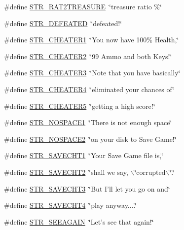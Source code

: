 \begin{DoxyCompactItemize}
\item 
\#define \hyperlink{FOREIGN_8H_aa2919e6a6af42cb4961631cf10e5a1b1}{STR\_\-RAT2TREASURE}~\char`\"{}treasure ratio    \%\char`\"{}
\item 
\#define \hyperlink{FOREIGN_8H_a0047673716c48cf2c05d5eb4bb2c71db}{STR\_\-DEFEATED}~\char`\"{}defeated!\char`\"{}
\item 
\#define \hyperlink{FOREIGN_8H_ab1be9c9331209b53ff85b5f8ee223cd4}{STR\_\-CHEATER1}~\char`\"{}You now have 100\% Health,\char`\"{}
\item 
\#define \hyperlink{FOREIGN_8H_a4c008f449f124be04de3ab1a9c850009}{STR\_\-CHEATER2}~\char`\"{}99 Ammo and both Keys!\char`\"{}
\item 
\#define \hyperlink{FOREIGN_8H_a9b0cd198a6495bd0e515f7766192b57f}{STR\_\-CHEATER3}~\char`\"{}Note that you have basically\char`\"{}
\item 
\#define \hyperlink{FOREIGN_8H_a4b8e72c3dab5be98c1d1347c5cedb2f4}{STR\_\-CHEATER4}~\char`\"{}eliminated your chances of\char`\"{}
\item 
\#define \hyperlink{FOREIGN_8H_a29835915ad7521839054c865dd6ccd25}{STR\_\-CHEATER5}~\char`\"{}getting a high score!\char`\"{}
\item 
\#define \hyperlink{FOREIGN_8H_af334155c31cf5b7d532a83b8b92a7abf}{STR\_\-NOSPACE1}~\char`\"{}There is not enough space\char`\"{}
\item 
\#define \hyperlink{FOREIGN_8H_a58818798b1f6231d2b7a7a9f1c89c92f}{STR\_\-NOSPACE2}~\char`\"{}on your disk to Save Game!\char`\"{}
\item 
\#define \hyperlink{FOREIGN_8H_a1561c5dd5358156375de580d9c83affc}{STR\_\-SAVECHT1}~\char`\"{}Your Save Game file is,\char`\"{}
\item 
\#define \hyperlink{FOREIGN_8H_a726598228f06d149b6e91feeb0939e5e}{STR\_\-SAVECHT2}~\char`\"{}shall we say, $\backslash$\char`\"{}corrupted$\backslash$\char`\"{}.\char`\"{}
\item 
\#define \hyperlink{FOREIGN_8H_a3b62ff592bd7af1c4553286fe05316f4}{STR\_\-SAVECHT3}~\char`\"{}But I'll let you go on and\char`\"{}
\item 
\#define \hyperlink{FOREIGN_8H_acf59b550db73585ad91672500c4135d3}{STR\_\-SAVECHT4}~\char`\"{}play anyway....\char`\"{}
\item 
\#define \hyperlink{FOREIGN_8H_a61cca78cefc5a4f20dc000ed288a19e0}{STR\_\-SEEAGAIN}~\char`\"{}Let's see that again!\char`\"{}
\end{DoxyCompactItemize}


